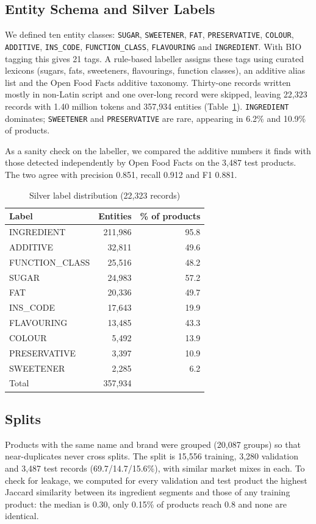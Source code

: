 \documentclass[conference]{IEEEtran}
\begin{document}
\subsection{Entity Schema and Silver Labels}
We defined ten entity classes: \texttt{SUGAR}, \texttt{SWEETENER}, \texttt{FAT}, \texttt{PRESERVATIVE}, \texttt{COLOUR}, \texttt{ADDITIVE}, \texttt{INS\_CODE}, \texttt{FUNCTION\_CLASS}, \texttt{FLAVOURING} and \texttt{INGREDIENT}. With BIO tagging this gives 21 tags. A rule-based labeller assigns these tags using curated lexicons (sugars, fats, sweeteners, flavourings, function classes), an additive alias list and the Open Food Facts additive taxonomy. Thirty-one records written mostly in non-Latin script and one over-long record were skipped, leaving 22,323 records with 1.40 million tokens and 357,934 entities (Table~\ref{tab:labels}). \texttt{INGREDIENT} dominates; \texttt{SWEETENER} and \texttt{PRESERVATIVE} are rare, appearing in 6.2\% and 10.9\% of products.

As a sanity check on the labeller, we compared the additive numbers it finds with those detected independently by Open Food Facts on the 3,487 test products. The two agree with precision 0.851, recall 0.912 and F1 0.881.

\begin{table}[t]
\caption{Silver label distribution (22,323 records)}
\label{tab:labels}
\centering
\begin{tabular}{lrr}
\toprule
Label & Entities & \% of products \\
\midrule
INGREDIENT & 211,986 & 95.8 \\
ADDITIVE & 32,811 & 49.6 \\
FUNCTION\_CLASS & 25,516 & 48.2 \\
SUGAR & 24,983 & 57.2 \\
FAT & 20,336 & 49.7 \\
INS\_CODE & 17,643 & 19.9 \\
FLAVOURING & 13,485 & 43.3 \\
COLOUR & 5,492 & 13.9 \\
PRESERVATIVE & 3,397 & 10.9 \\
SWEETENER & 2,285 & 6.2 \\
\midrule
Total & 357,934 & \\
\bottomrule
\end{tabular}
\end{table}

\subsection{Splits}
Products with the same name and brand were grouped (20,087 groups) so that near-duplicates never cross splits. The split is 15,556 training, 3,280 validation and 3,487 test records (69.7/14.7/15.6\%), with similar market mixes in each. To check for leakage, we computed for every validation and test product the highest Jaccard similarity between its ingredient segments and those of any training product: the median is 0.30, only 0.15\% of products reach 0.8 and none are identical.
\end{document}
